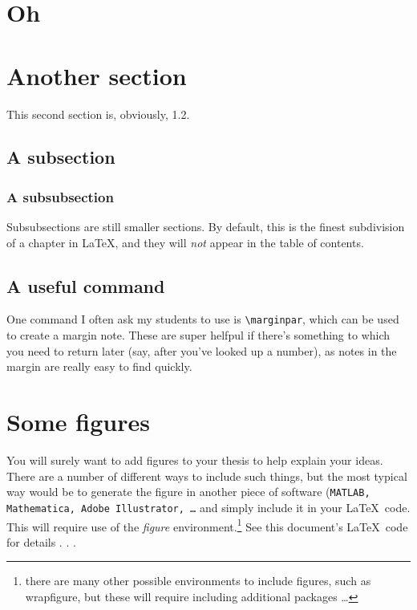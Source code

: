 \section{Oh}

\section{Another section}

This second section is, obviously, 1.2.

\subsection{A subsection}

\subsubsection{A subsubsection}

Subsubsections are still smaller sections.  By default, this is the finest subdivision of a chapter in \LaTeX, and they will \emph{not} appear in the table of contents.  

\subsection{A useful command}

One command I often ask my students to use is \texttt{\textbackslash marginpar}, which can be used to create a margin note.  These are super helfpul if there's something to which you need to return later (say, after you've looked up a number), as notes in the margin are really easy to find quickly.  

\section{Some figures}

You will surely want to add figures to your thesis to help explain your ideas.  There are a number of different ways to include such things, but the most typical way would be to generate the figure in another piece of software (\texttt{MATLAB, Mathematica, Adobe Illustrator, \ldots} and simply include it in your \LaTeX ~code.  This will require use of the \emph{figure} environment.\footnote{there are many other possible environments to include figures, such as wrapfigure, but these will require including additional packages \ldots}  See this document's \LaTeX ~code for details . . .

